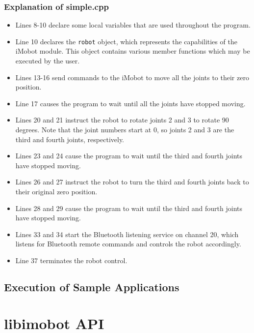 \documentclass[11pt]{report}
\begin{document}
\subsection{Explanation of simple.cpp}
\begin{itemize}
\item Lines 8-10 declare some local variables that are used throughout the program.
\item Line 10 declares the \texttt{robot} object, which represents the
capabilities of the iMobot module. This object contains various member
functions which may be executed by the user.
\item Lines 13-16 send commands to the iMobot to move all the joints to their
zero position.
\item Line 17 causes the program to wait until all the joints have stopped moving. 
\item Lines 20 and 21 instruct the robot to rotate joints 2 and 3 to rotate 90
degrees. Note that the joint numbers start at 0, so joints 2 and 3 are the
third and fourth joints, respectively. 
\item Lines 23 and 24 cause the program to wait until the third and fourth
joints have stopped moving.
\item Lines 26 and 27 instruct the robot to turn the third and fourth joints
back to their original zero position.
\item Lines 28 and 29 cause the program to wait until the third and fourth
joints have stopped moving.
\item Lines 33 and 34 start the Bluetooth listening service on channel 20,
which listens for Bluetooth remote commands and controls the robot accordingly. 
\item Line 37 terminates the robot control.
\end{itemize}

\section{Execution of Sample Applications}
\appendix
\chapter{libimobot API}

\pagebreak

{}
\printindex
\end{document}
